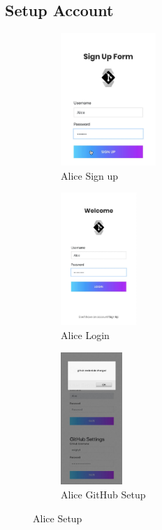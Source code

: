 \documentclass[12pt]{article}
\renewcommand{\_}{\kern-1.5pt\textunderscore\kern-1.5pt}
\begin{document}
\subsection{Setup Account}

\begin{figure}[H]
	\centering
	\begin{subfigure}[b]{.32\textwidth}
		\centering
		\includegraphics[height=5cm]{graphs/15. alice_sign_up}
		\caption{Alice Sign up}
	\end{subfigure}
	\begin{subfigure}[b]{.32\textwidth}
		\centering
		\includegraphics[height=5cm]{graphs/16. alice_login}
		\caption{Alice Login}
	\end{subfigure}
	\begin{subfigure}[b]{.32\textwidth}
		\centering
		\includegraphics[height=5cm]{graphs/17. alice_gitub_setup}
		\caption{Alice GitHub Setup}
	\end{subfigure}
	\caption{Alice Setup}
\end{figure}
\end{document}
